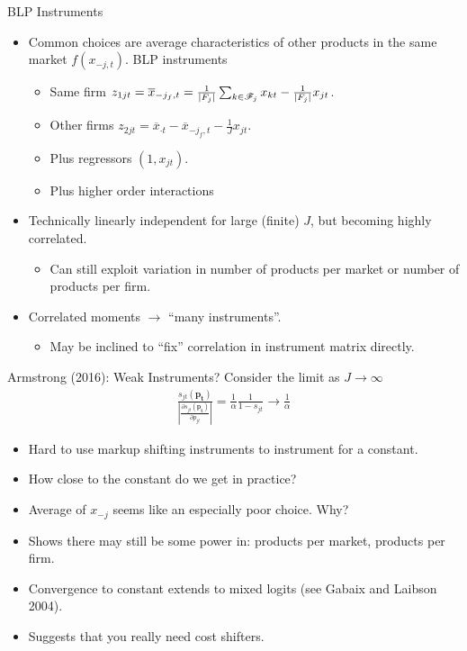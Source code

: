 \documentclass[aspectratio=169,11pt]{beamer}
\begin{document}
\begin{frame}{BLP Instruments}
\begin{itemize}
\item Common choices are average characteristics of other products in the same market $f(x_{-j,t})$. \alert{BLP instruments}
\begin{itemize}
\item Same firm $z_{1jt} = \overline{x}_{-j_f,t} = \frac{1}{\left\vert{F_j}\right\vert}  \sum_{k \in \mathscr{F}_j} x_{kt} - \frac{1}{\left\vert{F_j}\right\vert} x_{jt}$.
\item Other firms $z_{2jt}=\overline{x}_{\cdot t} - \overline{x}_{-j_f,t} - \frac{1}{J} x_{jt}$.
\item Plus regressors $(1, x_{jt})$.
\item Plus higher order interactions 
\end{itemize}
\item Technically linearly independent for large (finite) $J$, but becoming highly correlated.
\begin{itemize}
\item Can still exploit variation in number of products per market or number of products per firm.
\end{itemize}
\item Correlated moments $\rightarrow$ ``many instruments''.
\begin{itemize}
\item May be inclined to ``fix'' correlation in instrument matrix directly.
\end{itemize}
\end{itemize}
\end{frame}


\begin{frame}{Armstrong (2016): Weak Instruments?}
Consider the limit as $J \rightarrow \infty$
\begin{eqnarray*}
\frac{s_{jt}(\symbf{p_t})}{\left|\frac{\partial s_{jt}(\symbf{p_t})}{\partial p_{jt}}\right|} = \frac{1}{\alpha} \frac{1}{1-s_{jt}} \rightarrow \frac{1}{\alpha}
\end{eqnarray*}
\begin{itemize}
\item Hard to use markup shifting instruments to instrument for a constant.
\item How close to the constant do we get in practice?
\item Average of $x_{-j}$ seems like an especially poor choice. Why?
\item Shows there may still be some power in: products per market, products per firm.
\item Convergence to constant extends to mixed logits (see Gabaix and Laibson 2004).
\item Suggests that you really need cost shifters.
\end{itemize}
\end{frame}
\end{document}
